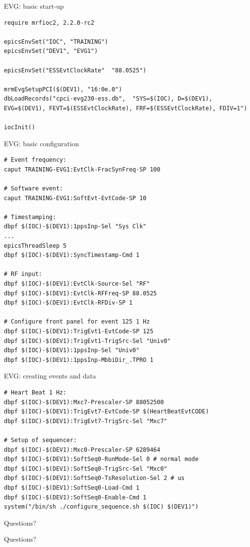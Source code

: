 \documentclass[
  9pt
  , table
  , ignorenonframetext
]{beamer}
\begin{document}
\begin{frame}[fragile]{EVG: basic start-up}
\begin{lstlisting}[style=termstyle,breaklines=true,basicstyle=\scriptsize]
require mrfioc2, 2.2.0-rc2

epicsEnvSet("IOC", "TRAINING")
epicsEnvSet("DEV1", "EVG1")

epicsEnvSet("ESSEvtClockRate"  "88.0525")

mrmEvgSetupPCI($(DEV1), "16:0e.0")
dbLoadRecords("cpci-evg230-ess.db",  "SYS=$(IOC), D=$(DEV1), EVG=$(DEV1), FEVT=$(ESSEvtClockRate), FRF=$(ESSEvtClockRate), FDIV=1")

iocInit()
\end{lstlisting}
\end{frame}

\begin{frame}[fragile]{EVG: basic configuration}
\begin{lstlisting}[style=termstyle,breaklines=true,basicstyle=\scriptsize]
# Event frequency:
caput TRAINING-EVG1:EvtClk-FracSynFreq-SP 100

# Software event:
caput TRAINING-EVG1:SoftEvt-EvtCode-SP 10

# Timestamping:
dbpf $(IOC)-$(DEV1):1ppsInp-Sel "Sys Clk"
...
epicsThreadSleep 5
dbpf $(IOC)-$(DEV1):SyncTimestamp-Cmd 1

# RF input:
dbpf $(IOC)-$(DEV1):EvtClk-Source-Sel "RF"
dbpf $(IOC)-$(DEV1):EvtClk-RFFreq-SP 88.0525
dbpf $(IOC)-$(DEV1):EvtClk-RFDiv-SP 1

# Configure front panel for event 125 1 Hz
dbpf $(IOC)-$(DEV1):TrigEvt1-EvtCode-SP 125
dbpf $(IOC)-$(DEV1):TrigEvt1-TrigSrc-Sel "Univ0"
dbpf $(IOC)-$(DEV1):1ppsInp-Sel "Univ0"
dbpf $(IOC)-$(DEV1):1ppsInp-MbbiDir_.TPRO 1

\end{lstlisting}
\end{frame}

\begin{frame}[fragile]{EVG: creating events and data}
\begin{lstlisting}[style=termstyle,breaklines=true,basicstyle=\scriptsize]
# Heart Beat 1 Hz:
dbpf $(IOC)-$(DEV1):Mxc7-Prescaler-SP 88052500
dbpf $(IOC)-$(DEV1):TrigEvt7-EvtCode-SP $(HeartBeatEvtCODE)
dbpf $(IOC)-$(DEV1):TrigEvt7-TrigSrc-Sel "Mxc7"

# Setup of sequencer:
dbpf $(IOC)-$(DEV1):Mxc0-Prescaler-SP 6289464
dbpf $(IOC)-$(DEV1):SoftSeq0-RunMode-Sel 0 # normal mode
dbpf $(IOC)-$(DEV1):SoftSeq0-TrigSrc-Sel "Mxc0"
dbpf $(IOC)-$(DEV1):SoftSeq0-TsResolution-Sel 2 # us
dbpf $(IOC)-$(DEV1):SoftSeq0-Load-Cmd 1
dbpf $(IOC)-$(DEV1):SoftSeq0-Enable-Cmd 1
system("/bin/sh ./configure_sequence.sh $(IOC) $(DEV1)")

\end{lstlisting}
\end{frame}


\begin{frame}{Questions?}
  \begin{center}
    {\Huge Questions?}
  \end{center}
\end{frame}
\end{document}
